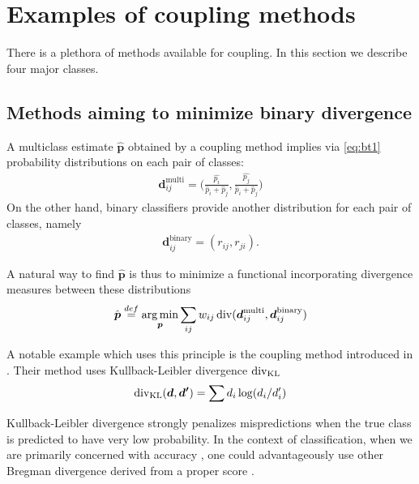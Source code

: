 

\section{Examples of coupling methods} \label{sec:coupling}

There is a plethora of methods available for coupling. In this section we describe four major classes.

\subsection{Methods aiming to minimize binary divergence}

A multiclass estimate $\hat{\boldsymbol{p}}$ obtained by a coupling method implies via \eqref{eq:bt1} probability distributions on each pair of classes:
\begin{align*}
	\boldsymbol{d}_{ij}^\textrm{multi}= \biggl(\frac{\hat{p_i}}{\hat p_i + \hat p_j},\frac{\hat{p_j}}{\hat p_i + \hat p_j}\biggr)	
\end{align*}
On the other hand, binary classifiers provide another distribution for each pair of  classes, namely
\begin{align*}
\boldsymbol{d}_{ij}^\textrm{binary} = ( r_{ij},  r_{ji}).
\end{align*}

A natural way to find  $\hat{\boldsymbol{p}}$ is thus to minimize a functional incorporating divergence measures between these distributions
\begin{align*}
\hat{\boldsymbol{p}} \stackrel{def}{=} \operatorname*{arg\,min}_{\boldsymbol{p}} \sum_{ij} w_{ij} \operatorname*{div} (\boldsymbol{d}_{ij}^\textrm{multi}, \boldsymbol{d}_{ij}^\textrm{binary})
\end{align*}

A notable example which uses this principle is the coupling method introduced in \cite{hastie1998classification}. Their method uses Kullback-Leibler divergence $\operatorname*{div}_\textrm{KL}$
\begin{align*}
	\operatorname*{div}\nolimits_\textrm{KL} (\boldsymbol{d}, \boldsymbol{d'})= \sum d_i \log (d_i/ d'_i)
\end{align*}

Kullback-Leibler divergence strongly penalizes  mispredictions when the true class is predicted to have very low probability. In the context of classification, when we are primarily concerned with accuracy , one could advantageously use other Bregman divergence derived from a proper score \cite{gneiting2007strictly, buja2005loss}.
 
